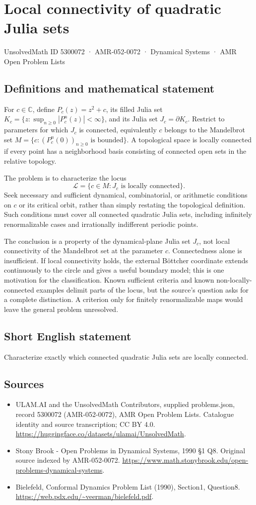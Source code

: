 \documentclass[11pt,a4paper]{article}
\begin{document}
\section*{Local connectivity of quadratic Julia sets}\label{5300072}
{\small UnsolvedMath ID 5300072 · AMR-052-0072 · Dynamical Systems · AMR Open Problem Lists}
\subsection{Definitions and mathematical statement}
For $c\in\mathbb C$, define $P_c(z)=z^2+c$, its filled Julia set
$K_c=\{z:\sup_{n\ge0}|P_c^n(z)|<\infty\}$, and its Julia set
$J_c=\partial K_c$. Restrict to parameters for which $J_c$ is
connected, equivalently $c$ belongs to the Mandelbrot set
$M=\{c:(P_c^n(0))_{n\ge0}\text{ is bounded}\}$.
A topological space is locally connected if every point has a
neighborhood basis consisting of connected open sets in the
relative topology.

The problem is to characterize the locus
\[
 \mathcal L=\{c\in M:J_c\text{ is locally connected}\}.
\]
Seek necessary and sufficient dynamical, combinatorial, or arithmetic
conditions on $c$ or its critical orbit, rather than simply restating
the topological definition. Such conditions must cover all connected
quadratic Julia sets, including infinitely renormalizable cases and
irrationally indifferent periodic points.

The conclusion is a property of the dynamical-plane Julia set
$J_c$, not local connectivity of the Mandelbrot set at the parameter
$c$. Connectedness alone is insufficient. If local connectivity
holds, the external Böttcher coordinate extends continuously to
the circle and gives a useful boundary model; this is one
motivation for the classification. Known sufficient criteria and
known non-locally-connected examples delimit parts of the locus,
but the source's question asks for a complete distinction. A
criterion only for finitely renormalizable maps would leave the
general problem unresolved.
\subsection{Short English statement}
Characterize exactly which connected quadratic Julia sets are locally connected.
\subsection{Sources}
\begin{itemize}
\item[S1] ULAM.AI and the UnsolvedMath Contributors, supplied problems.json, record 5300072 (AMR-052-0072), AMR Open Problem Lists. Catalogue identity and source transcription; CC BY 4.0.
\url{https://huggingface.co/datasets/ulamai/UnsolvedMath}.
\item[S2] Stony Brook - Open Problems in Dynamical Systems, 1990 §1 Q8. Original source indexed by AMR-052-0072.
\url{https://www.math.stonybrook.edu/open-problems-dynamical-systems}.
\item[S3] Bielefeld, Conformal Dynamics Problem List (1990), Section1, Question8.
\url{https://web.pdx.edu/~veerman/bielefeld.pdf}.
\end{itemize}
\end{document}
